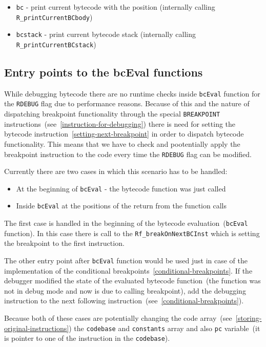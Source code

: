 \documentclass[thesis=M,english]{FITthesis}[2018/10/20]
\newcommand{\code}[1]{\texttt{#1}}
\begin{document}
{\begin{itemize}
	\item \code{bc} - print current bytecode with the position
		(internally calling \code{R{\_}printCurrentBCbody})
	\item \code{bcstack} - print current bytecode stack
		(internally calling \code{R{\_}printCurrentBCstack})
\end{itemize}

\subsection{Entry points to the bcEval functions}

While debugging bytecode there are no runtime checks inside \code{bcEval} function for the \code{RDEBUG} flag due to performance reasons. Because of this and the nature of dispatching breakpoint functionality through the special \code{BREAKPOINT} instructions~(see~\ref{instruction-for-debugging}) there is need for setting the bytecode instruction~\ref{setting-next-breakpoint} in order to dispatch bytecode functionality. This means that we have to check and pootentially apply the breakpoint instruction to the code every time the \code{RDEBUG} flag can be modified.

Currently there are two cases in which this scenario has to be handled:

\begin{itemize}
	\item At the beginning of \code{bcEval} - the bytecode function was just called
	\item Inside \code{bcEval} at the positions of the return from the function calls
\end{itemize}

The first case is handled in the beginning of the bytecode evaluation~(\code{bcEval} function). In this case there is call to the \code{Rf{\_}breakOnNextBCInst} which is setting the breakpoint to the first instruction.

The other entry point after \code{bcEval} function would be used just in case of the implementation of the conditional breakpoints~\ref{conditional-breakpoints}. If the debugger modified the state of the evaluated bytecode function~(the function was not in debug mode and now is due to calling breakpoint), add the debugging instruction to the next following instruction~(see~\ref{conditional-breakpoints}).

Because both of these cases are potentially changing the code array~(see~\ref{storing-original-instructions}) the \code{codebase} and \code{constants} array and also \code{pc} variable~(it is pointer to one of the instruction in the \code{codebase}).

}
\end{document}
